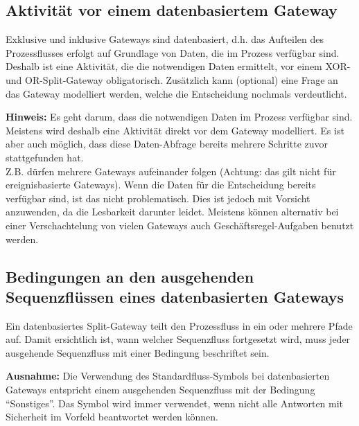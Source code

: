 \documentclass[12pt,report]{snetTeaching}
\begin{document}
\subsection{Aktivität vor einem datenbasiertem Gateway}

Exklusive und inklusive Gateways sind datenbasiert, d.h. das Aufteilen des Prozessflusses erfolgt auf Grundlage von Daten, die im Prozess verfügbar sind. Deshalb ist eine Aktivität, die die notwendigen Daten ermittelt, vor einem XOR- und OR-Split-Gateway obligatorisch. Zusätzlich kann (optional) eine Frage an das Gateway modelliert werden, welche die Entscheidung nochmals verdeutlicht.

\begin{Rahmen}
	\hfill
\end{Rahmen}

\textbf{Hinweis:} Es geht darum, dass die notwendigen Daten im Prozess verfügbar sind. Meistens wird deshalb eine Aktivität direkt vor dem Gateway modelliert. Es ist aber auch möglich, dass diese Daten-Abfrage bereits mehrere Schritte zuvor stattgefunden hat.\\
Z.B. dürfen mehrere Gateways aufeinander folgen (Achtung: das gilt nicht für ereignisbasierte Gateways). Wenn die Daten für die Entscheidung bereits verfügbar sind, ist das nicht problematisch. Dies ist jedoch mit Vorsicht anzuwenden, da die Lesbarkeit darunter leidet. Meistens können alternativ bei einer Verschachtelung von vielen Gateways auch Geschäftsregel-Aufgaben benutzt werden.

\pagebreak[4]
\subsection{Bedingungen an den ausgehenden Sequenzflüssen eines datenbasierten Gateways}

Ein datenbasiertes Split-Gateway teilt den Prozessfluss in ein oder mehrere Pfade auf. Damit ersichtlich ist, wann welcher Sequenzfluss fortgesetzt wird, muss jeder ausgehende Sequenzfluss mit einer Bedingung beschriftet sein.

\textbf{Ausnahme:} Die Verwendung des Standardfluss-Symbols bei datenbasierten Gateways entspricht einem ausgehenden Sequenzfluss mit der Bedingung "`Sonstiges"'. Das Symbol wird immer verwendet, wenn nicht alle Antworten mit Sicherheit im Vorfeld beantwortet werden können. 


\begin{Rahmen}
	\hfill
\end{Rahmen}
\end{document}
